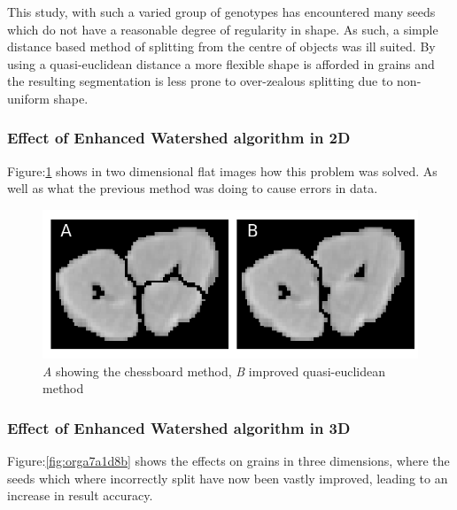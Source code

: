 \documentclass[11pt]{report}
\begin{document}
This study, with such a varied group of genotypes has encountered many seeds which do not have a reasonable degree of regularity in shape. As such, a simple distance based method of splitting from the centre of objects was ill suited. By using a quasi-euclidean distance a more flexible shape is afforded in grains and the resulting segmentation is less prone to over-zealous splitting due to non-uniform shape.

\subsubsection{Effect of Enhanced Watershed algorithm in 2D}
\label{sec:orgea21d0c}

Figure:\ref{fig:orgab929da} shows in two dimensional flat images how this problem was solved. As well as what the previous method was doing to cause errors in data.
\begin{figure}[htbp]
\centering
\includegraphics[width=16cm]{./images/chess_quasi.png}
\caption{\label{fig:orgab929da}
\emph{A} showing the chessboard method, \emph{B} improved quasi-euclidean method}
\end{figure}

\clearpage
\subsubsection{Effect of Enhanced Watershed algorithm in 3D}
\label{sec:org99928cf}

Figure:\ref{fig:orga7a1d8b} shows the effects on grains in three dimensions, where the seeds which where incorrectly split have now been vastly improved, leading to an increase in result accuracy.
\end{document}
